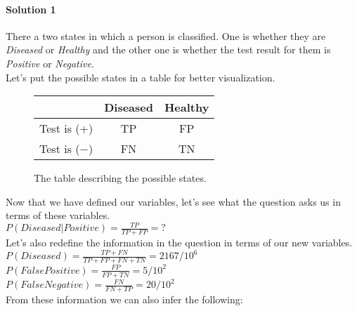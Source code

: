 \documentclass[12pt]{article}
\begin{document}
\paragraph{Solution 1}
There a two states in which a person is classified. 
One is whether they are \textit{Diseased} or \textit{Healthy} and the other 
one is whether the test result for them is \textit{Positive} or \textit{Negative}. \\

Let's put the possible states in a table for better visualization.
\newcommand\ddfrac[2]{\frac{\displaystyle #1}{\displaystyle #2}}




\begin{figure}[h]
    \centering
    \begin{center}
        \begin{tabular}{|c|c|c|} 
         \hline
          & Diseased & Healthy \\ 
         \hline
         Test is (+) & TP & FP \\ 
         \hline
         Test is (\(-\)) & FN & TN \\ 
         \hline
        \end{tabular}
    \end{center}
    \caption{The table describing the possible states.}
    \label{table1}
\end{figure}


Now that we have defined our variables, 
let's see what the question asks us in terms of these variables. \\

$P(Diseased|Positive) = \ddfrac{TP}{TP + FP} = ?$ \\


Let's also redefine the information in the question in terms of our new variables. \\


\(P(Diseased) = \ddfrac{TP + FN}{TP + FP + FN + TN} = 2167/10^{6}\) \\

\(P(False Positive) = \ddfrac{FP}{FP + TN} = 5/10^{2}\) \\

\(P(False Negative) = \ddfrac{FN}{FN + TP} = 20/10^{2}\) \\

\pagebreak
From these information we can also infer the following: \\
\end{document}

